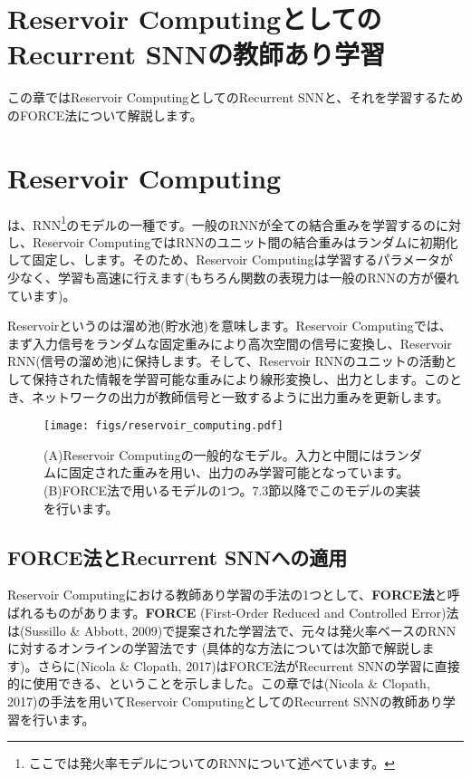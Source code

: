 \section{Reservoir ComputingとしてのRecurrent SNNの教師あり学習}
この章ではReservoir ComputingとしてのRecurrent SNNと、それを学習するためのFORCE法について解説します。
\section{Reservoir Computing}
\textbf{}は、RNN\footnote{ここでは発火率モデルについてのRNNについて述べています。}のモデルの一種です。一般のRNNが全ての結合重みを学習するのに対し、Reservoir ComputingではRNNのユニット間の結合重みはランダムに初期化して固定し、\textbf{}します。そのため、Reservoir Computingは学習するパラメータが少なく、学習も高速に行えます(もちろん関数の表現力は一般のRNNの方が優れています)。\par
Reservoirというのは溜め池(貯水池)を意味します。Reservoir Computingでは、まず入力信号をランダムな固定重みにより高次空間の信号に変換し、Reservoir RNN(信号の溜め池)に保持します。そして、Reservoir RNNのユニットの活動として保持された情報を学習可能な重みにより線形変換し、出力とします。このとき、ネットワークの出力が教師信号と一致するように出力重みを更新します。

\begin{figure}[htbp]
    \centering
    \texttt{[image: figs/reservoir\_computing.pdf]}
    \caption{(A)Reservoir Computingの一般的なモデル。入力と中間にはランダムに固定された重みを用い、出力のみ学習可能となっています。 (B)FORCE法で用いるモデルの1つ。7.3節以降でこのモデルの実装を行います。}
    \label{fig:RC}
\end{figure}
\subsection{FORCE法とRecurrent SNNへの適用}
Reservoir Computingにおける教師あり学習の手法の1つとして、\textbf{FORCE法}と呼ばれるものがあります。\textbf{FORCE} (First-Order Reduced and Controlled Error)法は(Sussillo \& Abbott, 2009)で提案された学習法で、元々は発火率ベースのRNNに対するオンラインの学習法です (具体的な方法については次節で解説します)。さらに(Nicola \& Clopath, 2017)はFORCE法がRecurrent SNNの学習に直接的に使用できる、ということを示しました。この章では(Nicola \& Clopath, 2017)の手法を用いてReservoir ComputingとしてのRecurrent SNNの教師あり学習を行います。
